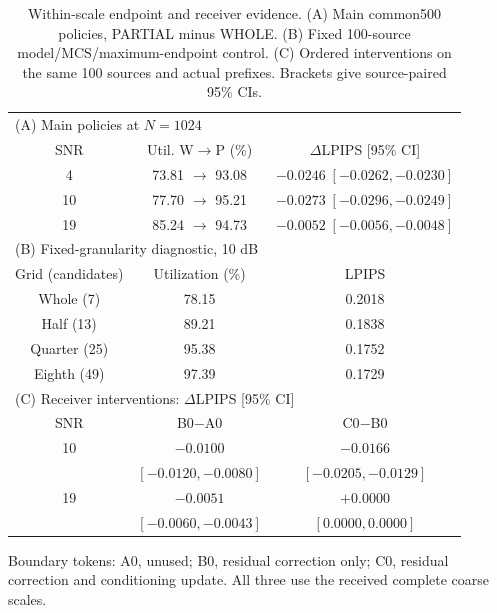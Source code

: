\begin{table}[t]
\caption{Within-scale endpoint and receiver evidence. (A) Main common500 policies, PARTIAL minus WHOLE. (B) Fixed 100-source model/MCS/maximum-endpoint control. (C) Ordered interventions on the same 100 sources and actual prefixes. Brackets give source-paired 95\% CIs.}
\label{tab:internal}
\centering\footnotesize
\setlength{\tabcolsep}{2.5pt}
\begin{tabular}{ccc}
\toprule
\multicolumn{3}{l}{(A) Main policies at $N=1024$} \\
SNR & Util. W$\to$P (\%) & $\Delta$LPIPS [95\% CI] \\
\midrule
4 & 73.81 $\to$ 93.08 & $-0.0246\;[-0.0262,-0.0230]$ \\
10 & 77.70 $\to$ 95.21 & $-0.0273\;[-0.0296,-0.0249]$ \\
19 & 85.24 $\to$ 94.73 & $-0.0052\;[-0.0056,-0.0048]$ \\
\midrule
\multicolumn{3}{l}{(B) Fixed-granularity diagnostic, 10 dB} \\
Grid (candidates) & Utilization (\%) & LPIPS \\
Whole (7) & 78.15 & 0.2018 \\
Half (13) & 89.21 & 0.1838 \\
Quarter (25) & 95.38 & 0.1752 \\
Eighth (49) & 97.39 & 0.1729 \\
\midrule
\multicolumn{3}{l}{(C) Receiver interventions: $\Delta$LPIPS [95\% CI]} \\
SNR & B0$-$A0 & C0$-$B0 \\
10 & $-0.0100$ & $-0.0166$ \\
 & $[-0.0120,-0.0080]$ & $[-0.0205,-0.0129]$ \\
19 & $-0.0051$ & $+0.0000$ \\
 & $[-0.0060,-0.0043]$ & $[0.0000,0.0000]$ \\
\bottomrule
\end{tabular}
\par\smallskip\parbox{\columnwidth}{\footnotesize Boundary tokens: A0, unused; B0, residual correction only; C0, residual correction and conditioning update. All three use the received complete coarse scales.}
\end{table}
